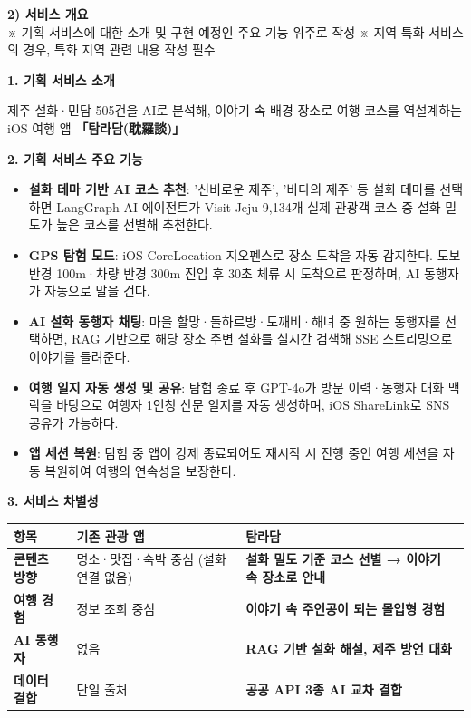 \documentclass[12pt,a4paper]{article}
\newcommand{\sectionheader}[2]{%
  \vspace{3mm}%
  \noindent\colorbox{sectiongray}{%
    \parbox{\dimexpr\textwidth-2\fboxsep\relax}{%
      \vspace{2pt}%
      \textbf{#1}\\%
      {\small #2}%
      \vspace{2pt}%
    }%
  }%
  \vspace{2mm}%
}
\begin{document}
\vspace{2mm}

\sectionheader{2) 서비스 개요}{%
  ※ 기획 서비스에 대한 소개 및 구현 예정인 주요 기능 위주로 작성\newline
  ※ 지역 특화 서비스의 경우, 특화 지역 관련 내용 작성 필수}

\textbf{1. 기획 서비스 소개}

제주 설화·민담 505건을 AI로 분석해, 이야기 속 배경 장소로 여행 코스를 역설계하는 iOS 여행 앱 \textbf{「탐라담(耽羅談)」}

\vspace{2mm}
\textbf{2. 기획 서비스 주요 기능}

\begin{itemize}
  \item \textbf{설화 테마 기반 AI 코스 추천}: '신비로운 제주', '바다의 제주' 등 설화 테마를 선택하면 LangGraph AI 에이전트가 Visit Jeju 9,134개 실제 관광객 코스 중 설화 밀도가 높은 코스를 선별해 추천한다.
  \item \textbf{GPS 탐험 모드}: iOS CoreLocation 지오펜스로 장소 도착을 자동 감지한다. 도보 반경 100m·차량 반경 300m 진입 후 30초 체류 시 도착으로 판정하며, AI 동행자가 자동으로 말을 건다.
  \item \textbf{AI 설화 동행자 채팅}: 마을 할망·돌하르방·도깨비·해녀 중 원하는 동행자를 선택하면, RAG 기반으로 해당 장소 주변 설화를 실시간 검색해 SSE 스트리밍으로 이야기를 들려준다.
  \item \textbf{여행 일지 자동 생성 및 공유}: 탐험 종료 후 GPT-4o가 방문 이력·동행자 대화 맥락을 바탕으로 여행자 1인칭 산문 일지를 자동 생성하며, iOS ShareLink로 SNS 공유가 가능하다.
  \item \textbf{앱 세션 복원}: 탐험 중 앱이 강제 종료되어도 재시작 시 진행 중인 여행 세션을 자동 복원하여 여행의 연속성을 보장한다.
\end{itemize}

\vspace{2mm}
\textbf{3. 서비스 차별성}

\begin{center}
\begin{tabular}{|>{\bfseries}p{3.2cm}|p{4.8cm}|p{5.8cm}|}
\hline
\rowcolor{lightgray}
\textbf{항목} & \textbf{기존 관광 앱} & \textbf{탐라담} \\
\hline
콘텐츠 방향 & 명소·맛집·숙박 중심 (설화 연결 없음) & \textbf{설화 밀도 기준 코스 선별 → 이야기 속 장소로 안내} \\
\hline
여행 경험 & 정보 조회 중심 & \textbf{이야기 속 주인공이 되는 몰입형 경험} \\
\hline
AI 동행자 & 없음 & \textbf{RAG 기반 설화 해설, 제주 방언 대화} \\
\hline
데이터 결합 & 단일 출처 & \textbf{공공 API 3종 AI 교차 결합} \\
\hline
\end{tabular}
\end{center}
\end{document}
